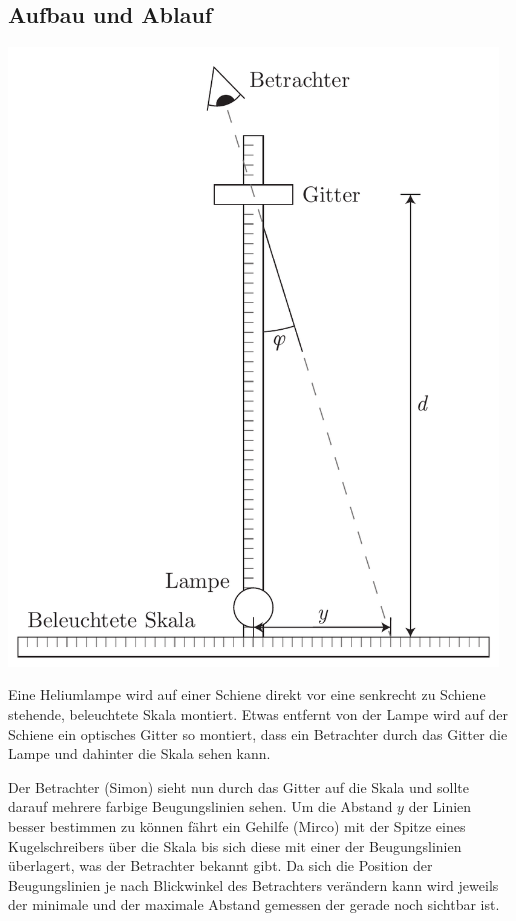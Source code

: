 \documentclass[12pt,a4paper]{article}
\begin{document}
\subsection*{Aufbau und Ablauf}
\begin{center}
\includegraphics[width=13cm]{illustration.pdf}
\end{center}

Eine Heliumlampe wird auf einer Schiene direkt vor eine senkrecht zu Schiene stehende, beleuchtete Skala montiert. Etwas entfernt von der Lampe wird auf der Schiene ein optisches Gitter so montiert, dass ein Betrachter durch das Gitter die Lampe und dahinter die Skala sehen kann.

Der Betrachter (Simon) sieht nun durch das Gitter auf die Skala und sollte darauf mehrere farbige Beugungslinien sehen. Um die Abstand $y$ der Linien besser bestimmen zu k\"onnen f\"ahrt ein Gehilfe (Mirco) mit der Spitze eines Kugelschreibers \"uber die Skala bis sich diese mit einer der Beugungslinien \"uberlagert, was der Betrachter bekannt gibt. Da sich die Position der Beugungslinien je nach Blickwinkel des Betrachters ver\"andern kann wird jeweils der minimale und der maximale Abstand gemessen der gerade noch sichtbar ist.
\end{document}
